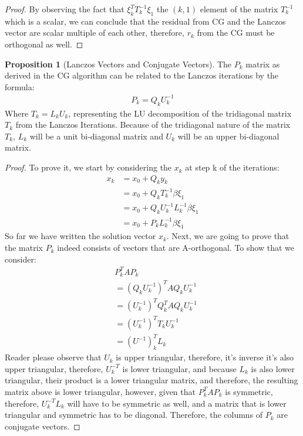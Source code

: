 \documentclass[]{article}
\theoremstyle{definition}
\newtheorem{prop}{Proposition}[section]  %
\begin{document}
\begin{proof}
                By observing the fact that $\xi^T_kT^{-1}_k\xi_1$ the $(k, 1)$ element of the matrix $T_k^{-1}$ which is a scalar, we can conclude that the residual from CG and the Lanczos vector are scalar multiple of each other, therefore, $r_k$ from the CG must be orthogonal as well. 
            \end{proof}
            \begin{prop}[Lanczos Vectors and Conjugate Vectors]
                The $P_k$ matrix as derived in the CG algorithm can be related to the Lanczos iterations by the formula: 
                \begin{align}
                    P_k = Q_k U_k^{-1}
                \end{align}
                Where $T_k = L_kU_k$, representing the LU decomposition of the tridiagonal matrix $T_k$ from the Lanczos Iterations. Because of the tridiagonal nature of the matrix $T_k$, $L_k$ will be a unit bi-diagonal matrix and $U_k$ will be an upper bi-diagonal matrix. 
            \end{prop}
            \begin{proof}
                To prove it, we start by considering the $x_k$ at step k of the iterations: 
                \begin{align}
                    x_k &= x_0 + Q_k y_k 
                    \\
                    &= x_0 + Q_k T_{k}^{-1} \beta \xi_1
                    \\
                    &= x_0 + Q_k U_k^{-1}L_k^{-1}\beta \xi_1
                    \\
                    &= x_0 + P_k L_k^{-1}\beta\xi_1
                \end{align}
                So far we have written the solution vector $x_k$. Next, we are going to prove that the matrix $P_k$ indeed consists of vectors that are A-orthogonal. To show that we consider: 
                \begin{align}
                    & P_k^TAP_k
                    \\
                    &= (Q_k U_k^{-1})^T AQ_kU_k^{-1}
                    \\
                    &= (U_k^{-1})^{T}Q_k^{T}AQ_k U_k^{-1}
                    \\
                    &= (U_k^{-1})^{T}T_kU_k^{-1}
                    \\
                    &= (U^{-1})^T_kL_k
                \end{align}
                Reader please observe that $U_k$ is upper triangular, therefore, it's inverse it's also upper triangular, therefore, $U_k^{-T}$ is lower triangular, and because $L_k$ is also lower triangular, their product is a lower triangular matrix, and therefore, the resulting matrix above is lower triangular, however, given that $P_k^TAP_k$ is symmetric, therefore, $U_k^{-T}L_k$ will have to be symmetric as well, and a matrix that is lower triangular and symmetric has to be diagonal. Therefore, the columns of $P_k$ are conjugate vectors. 
            \end{proof}
\end{document}
